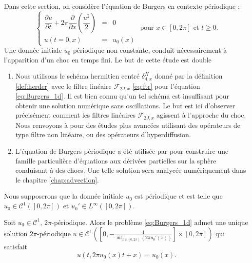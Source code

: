 Dans cette section, on considère l'équation de Burgers en contexte périodique \cite{Burgers1948, Witham1974} :
\begin{equation}
\left\lbrace
\begin{array}{rcl}
\dfrac{\partial u}{\partial t} + 2 \pi \dfrac{\partial}{\partial x} \left( \dfrac{u^2}{2} \right) & = & 0 \\
u(t=0,x) & = & u_0(x)
\end{array}
\right. \text{ pour } x \in [0, 2\pi] \text{ et } t \geq 0.
\label{eq:Burgers_1d}
\end{equation}
Une donnée initiale $u_0$ périodique non constante, conduit nécessairement à l'apparition d'un choc en temps fini. Le but de cette étude est double
\begin{enumerate}
\item Nous utilisons le schéma hermitien centré $\delta_{4,x}^H$ donné par la définition \ref{def:herder}  avec le filtre linéaire $\mathcal{F}_{2J,x}$ \eqref{eq:ftr} pour l'équation \eqref{eq:Burgers_1d}. Il est bien connu qu'un tel schéma est insuffisant pour obtenir une solution numérique sans oscillations. Le but est ici d'observer précisément comment les filtres linéaires $\mathcal{F}_{2J,x}$ agissent à l'approche du choc. Nous renvoyons à \cite{Yee1989, Cook2005} pour des études plus avancées utilisant des opérateurs de type filtre non linéaire, ou des opérateurs d'hyperdiffusion.

\item L'équation de Burgers périodique a été utilisée par \cite{BenArtzi2009} pour construire une famille particulière d'équations aux dérivées partielles sur la sphère conduisant à des chocs. Une telle solution sera analycée numériquement dans le chapitre \ref{chap:advection}.
\end{enumerate}

Nous supposerons que la donnée initiale $u_0$ est périodique et est telle que $u_0 \in \mathcal{C}^1([0,2 \pi])$ et $u_0' \in L^{\infty}([0,2 \pi])$.

\begin{theoreme}
Soit $u_0 \in \mathcal{C}^1$, $2 \pi$-périodique. Alors le problème \eqref{eq:Burgers_1d} admet une unique solution $2 \pi$-périodique $u \in \mathcal{C}^1\left(\left[0, -\frac{1}{\inf_{x \in [0,2\pi]} (2 \pi u_0'(x))}\right] \times [0, 2 \pi]\right)$ qui satisfait
\begin{equation}
u(t,2 \pi u_0(x)t + x)=u_0(x).
\end{equation}
\end{theoreme}

